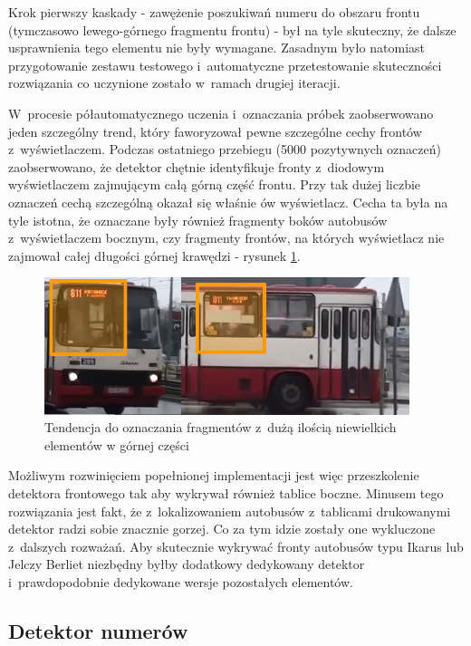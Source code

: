 Krok pierwszy kaskady - zawężenie poszukiwań numeru do obszaru frontu
(tymczasowo lewego-górnego fragmentu frontu) - był na tyle skuteczny,
że dalsze usprawnienia tego elementu nie były wymagane. Zasadnym było
natomiast przygotowanie zestawu testowego i~automatyczne 
przetestowanie skuteczności rozwiązania co uczynione 
zostało w~ramach drugiej iteracji.

W~procesie półautomatycznego uczenia i~oznaczania
próbek
zaobserwowano jeden szczególny trend, który faworyzował pewne
szczególne cechy frontów z~wyświetlaczem. Podczas ostatniego przebiegu
(5000 pozytywnych oznaczeń) zaobserwowano, że detektor
chętnie identyfikuje fronty z~diodowym wyświetlaczem zajmującym 
całą górną część frontu. Przy tak dużej liczbie oznaczeń
cechą szczególną okazał się właśnie ów wyświetlacz. Cecha ta była
na tyle istotna, że oznaczane były również fragmenty boków autobusów
z~wyświetlaczem bocznym, czy fragmenty frontów, na których wyświetlacz
nie zajmował całej długości górnej krawędzi - rysunek
\ref{fig:frontdetectormorph}.

\begin{figure}[!h]
    \centering
    \includegraphics[width=0.95\textwidth]{img/exp_front_detector_curiosity}
    \caption{Tendencja do oznaczania fragmentów z~dużą ilością
    niewielkich elementów w górnej części}
    \label{fig:frontdetectormorph}
\end{figure}

Możliwym rozwinięciem popełnionej implementacji jest więc przeszkolenie
detektora frontowego tak aby wykrywał również tablice boczne. Minusem
tego rozwiązania jest fakt, że z~lokalizowaniem autobusów z~tablicami
drukowanymi detektor radzi sobie znacznie gorzej. Co za tym idzie
zostały one wykluczone z~dalszych rozważań. Aby skutecznie wykrywać
fronty autobusów typu Ikarus lub Jelczy Berliet niezbędny byłby 
dodatkowy dedykowany detektor i~prawdopodobnie dedykowane wersje
pozostałych elementów.

\subsection{Detektor numerów}

